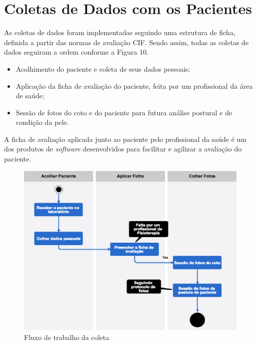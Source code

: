 \section{Coletas de Dados com os Pacientes}


    As coletas de dados foram implementadas seguindo uma estrutura de ficha, definida a partir das normas de avaliação CIF. Sendo assim, todas as coletas de dados seguiram a ordem conforme a Figura 10. 

    \begin{itemize}
        \item Acolhimento do paciente e coleta de seus dados pessoais;
        \item Aplicação da ficha de avaliação do paciente, feita por um profissional da área de saúde;
        \item Sessão de fotos do coto e do paciente para futura análise postural e de condição da pele.
    \end{itemize}

    A ficha de avaliação aplicada junto ao paciente pelo profissional da saúde é um dos produtos de \textit{software} desenvolvidos para facilitar e agilizar a avaliação do paciente.

    \begin{figure}[ht]
        \centering
        \label{fig10}
            \includegraphics[keepaspectratio=true, scale=0.4]{editaveis/images/colet_flow.eps}
        \caption{Fluxo de trabalho da coleta}
    \end{figure}

